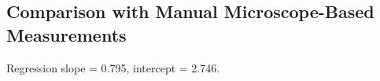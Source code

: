 \subsection{Comparison with Manual Microscope-Based Measurements}

Regression slope = 0.795, intercept = 2.746.